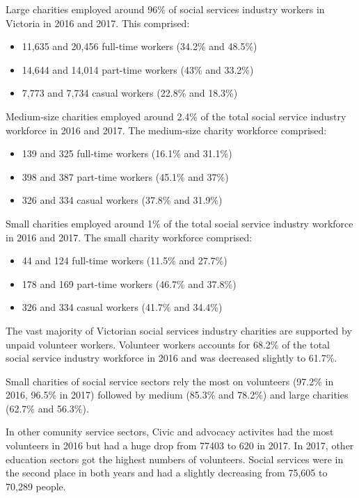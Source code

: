 \documentclass[
  11pt,
]{article}
\providecommand{\tightlist}{%
  \setlength{\itemsep}{0pt}\setlength{\parskip}{0pt}}
\begin{document}
Large charities employed around 96\% of social services industry workers in Victoria in 2016 and 2017.
This comprised:

\begin{itemize}
\tightlist
\item
  11,635 and 20,456 full-time workers (34.2\% and 48.5\%)
\item
  14,644 and 14,014 part-time workers (43\% and 33.2\%)
\item
  7,773 and 7,734 casual workers (22.8\% and 18.3\%)
\end{itemize}

Medium-size charities employed around 2.4\% of the total social service industry workforce in 2016 and 2017. The medium-size charity workforce comprised:

\begin{itemize}
\tightlist
\item
  139 and 325 full-time workers (16.1\% and 31.1\%)
\item
  398 and 387 part-time workers (45.1\% and 37\%)
\item
  326 and 334 casual workers (37.8\% and 31.9\%)
\end{itemize}

Small charities employed around 1\% of the total social service industry workforce in 2016 and 2017. The small charity workforce comprised:

\begin{itemize}
\tightlist
\item
  44 and 124 full-time workers (11.5\% and 27.7\%)
\item
  178 and 169 part-time workers (46.7\% and 37.8\%)
\item
  326 and 334 casual workers (41.7\% and 34.4\%)
\end{itemize}

The vast majority of Victorian social services industry charities are supported by unpaid volunteer workers. Volunteer workers accounts for 68.2\% of the total social service industry workforce in 2016 and was decreased slightly to 61.7\%.

Small charities of social service sectors rely the most on volunteers (97.2\% in 2016, 96.5\% in 2017) followed by medium (85.3\% and 78.2\%) and large charities (62.7\% and 56.3\%).

In other comunity service sectors, Civic and advocacy activites had the most volunteers in 2016 but had a huge drop from 77403 to 620 in 2017. In 2017, other education sectors got the highest numbers of volunteers. Social services were in the second place in both years and had a slightly decreasing from 75,605 to 70,289 people.
\end{document}
